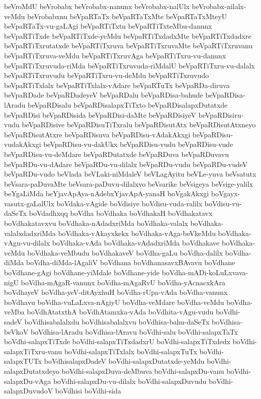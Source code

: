 {beVroMdU
beVrobabx
beVrobabx-nanunx
beVrobabx-nalUlx
beVrobabx-nilalx-veMdu
beVrobabxnu
beVpaRTaTx
beVpaRTaTxMte
beVpaRTaTxMteyU
beVpaRTaTx-vu-gaLAgi
beVpaRTiTxtu
beVpaRTiTxteMbu-danunx
beVpaRTiTxde
beVpaRTiTxde-yeMdu
beVpaRTiTxdadxMte
beVpaRTiTxdadxre
beVpaRTiTxrutatxde
beVpaRTiTxruva
beVpaRTiTxruvaMte
beVpaRTiTxruvanu
beVpaRTiTxruva-veMdu
beVpaRTiTxruvAga
beVpaRTiTxru-vu-danunx
beVpaRTiTxruvuda-riMda
beVpaRTiTxruvuda-riMdalU
beVpaRTiTxru-vu-dalalx
beVpaRTiTxruvudu
beVpaRTiTxru-vu-deMdu
beVpaRTiTxruvudo
beVpaRTiTxlalx
beVpaRTiTxlalx-vAdare
beVpaRTuTx
beVpaRDa-diruva
beVpaRDade
beVpaRDadeyeV
beVpaRDalu
beVpaRDisa-bahude
beVpaRDisa-lAradu
beVpaRDisalu
beVpaRDisalapxTiTxto
beVpaRDisalapxDutatxde
beVpaRDisi
beVpaRDisida
beVpaRDisi-daMte
beVpaRDisiyeV
beVpaRDisiru-vudu
beVpaRDisive
beVpaRDisuTiTxralu
beVpaRDisutAtx
beVpaRDisutAtxneyo
beVpaRDisutAtxre
beVpaRDisuva
beVpaRDisu-vAdakAkxgi
beVpaRDisu-vudakAkxgi
beVpaRDisu-vu-dakUkx
beVpaRDisu-vudu
beVpaRDisu-vude
beVpaRDisu-vu-deMdare
beVpaRDutatxde
beVpaRDuva
beVpaRDuvavu
beVpaRDu-vu-dAdare
beVpaRDu-vu-dilalx
beVpaRDu-vudu
beVpaRDu-vudeV
beVpaRDu-vudo
beVlada
beVLaki-niMdaleV
beVLagAyitu
beVLe-yuva
beVsatutx
beVsara-paDuvaMte
beVsara-paDuvu-dilalxvo
beVsarike
beVsigeya
beVsige-yalilx
beYgaLiMda
beYjavApAya-nAdebxYjavApA-yanaH
boVgakAkxgi
boVgayx-vasutx-gaLalUlx
boVdaka-vAgide
boVdisiye
boVdisu-vuda-ralilx
boVdisu-vu-daSeTx
boVdadhxqq
boVdha
boVdhaka
boVdhakaH
boVdhakatavx
boVdhakatavxvu
boVdhaka-nAdadxriMda
boVdhaka-valalx
boVdhaka-valalxdadxriMda
boVdhaka-vAkayxkekx
boVdhaka-vAga-beVkeMdu
boVdhaka-vAgu-vu-dilalx
boVdhaka-vAda
boVdhaka-vAdadxriMda
boVdhakave
boVdhaka-veMdu
boVdhaka-veMbudu
boVdhakaveV
boVdha-gaLu
boVdha-dalilx
boVdha-diMda
boVdha-diMda-lAgaliV
boVdhana
boVdhanasavxBAvavu
boVdhane
boVdhane-gAgi
boVdhane-yiMdale
boVdhane-yide
boVdha-mADi-koLuLxvava-nigU
boVdha-mAgaR-vanunx
boVdha-mAgaRvU
boVdha-yAcnacxkAra
boVdhayeV
boVdha-yeV-ditAyxhuH
boVdha-rUpa-vAda
boVdha-vanunx
boVdhavu
boVdha-vuLaLxva-nAgiyU
boVdha-veMdare
boVdha-veMdu
boVdha-veMba
boVdhAtatxthA
boVdhAtamxka-vAda
boVdhita-vAgu-vudu
boVdhi-sadeV
boVdhisabalalxdu
boVdhisabalalxvu
boVdhisa-bahu-daSeTx
boVdhisa-beVkoV
boVdhisa-lAradu
boVdhisa-lAravu
boVdhi-salu
boVdhi-salapxTaTx
boVdhi-salapxTiTxde
boVdhi-salapxTiTxdadxrU
boVdhi-salapxTiTxdedx
boVdhi-salapxTiTxru-vanu
boVdhi-salapxTiTxlalx
boVdhi-salapxTuTx
boVdhi-salapxTUTx
boVdhisalapxDadeV
boVdhi-salapxDutatxde-yeMdu
boVdhi-salapxDutatxdeyo
boVdhi-salapxDuva-deMbuva
boVdhi-salapxDu-vanu
boVdhi-salapxDu-vAga
boVdhi-salapxDu-vu-dilalx
boVdhi-salapxDuvudu
boVdhi-salapxDuvudoV
boVdhisi
boVdhi-sida
}
